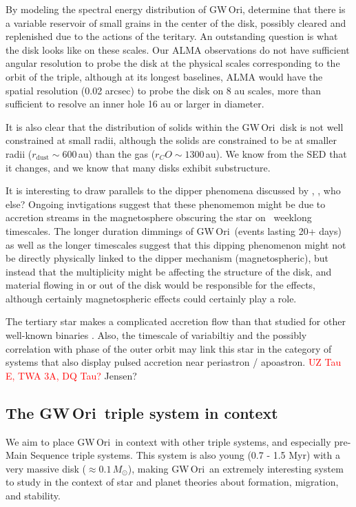 \documentclass[twocolumn]{aastex61}
\newcommand{\todo}[1]{ \textcolor{red}{#1}}
\newcommand{\obj}{GW\,Ori}
\newcommand{\twelve}{CO}
\begin{document}
By modeling the spectral energy distribution of \obj, \citet{fang14} determine that there is a variable reservoir of small grains in the center of the disk, possibly cleared and replenished due to the actions of the teritary. An outstanding question is what the disk looks like on these scales. Our ALMA observations do not have sufficient angular resolution to probe the disk at the physical scales corresponding to the orbit of the triple, although at its longest baselines, ALMA would have the spatial resolution (0.02 arcsec) to probe the disk on 8 au scales, more than sufficient to resolve an inner hole 16 au or larger in diameter.

It is also clear that the distribution of solids within the \obj\ disk is not well constrained at small radii, although the solids are constrained to be at smaller radii ($r_\mathrm{dust} \sim 600$\,au) than the gas ($r_\twelve \sim 1300\,$au). We know from the SED that it changes, and we know that many disks exhibit substructure.

It is interesting to draw parallels to the dipper phenomena discussed by \citet{cody},  \citet{ansdell}, who else? Ongoing invtigations suggest that these phenomemon might be due to accretion streams in the magnetosphere \citep{romanova} obscuring the star on ~weeklong timescales. The longer duration dimmings of \obj\ (events lasting 20+ days) as well as the longer timescales suggest that this dipping phenomenon might not be directly physically linked to the dipper mechanism (magnetospheric), but instead that the multiplicity might be affecting the structure of the disk, and material flowing in or out of the disk would be responsible for the effects, although certainly magnetospheric effects could certainly play a role.

The tertiary star makes a complicated accretion flow than that studied for other well-known binaries \citep[e.g., DQ~Tau;]{artymowicz94,mathieu97}. Also, the timescale of variabiltiy and the possibly correlation with phase of the outer orbit may link this star in the category of systems that also display pulsed accretion near periastron / apoastron. \todo{UZ Tau E, TWA 3A, DQ Tau?} Jensen?

\subsection{The \obj\ triple system in context}
We aim to place \obj\ in context with other triple systems, and especially pre-Main Sequence triple systems. This system is also young (0.7 - 1.5 Myr) with a very massive disk ($\approx 0.1\,M_\odot$), making \obj\ an extremely interesting system to study in the context of star and planet theories about formation, migration, and stability.
\end{document}

